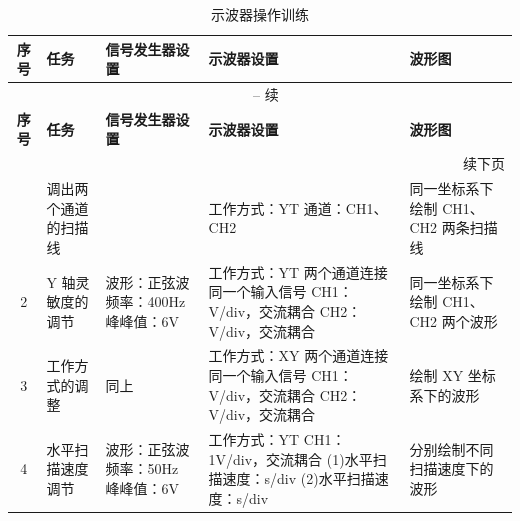 \documentclass[12pt,a4paper]{article}
\begin{document}
\begin{longtable}{|c|p{2cm}|p{2.5cm}|p{4.5cm}|p{4cm}|}
    \caption{示波器操作训练} \\
    \hline
    \textbf{序号} & \textbf{任务} & \textbf{信号发生器设置} & \textbf{示波器设置} & \textbf{波形图} \\
    \hline
    \endfirsthead
    
    \multicolumn{5}{c}{{\tablename\ \thetable{} -- 续}} \\
    \hline
    \textbf{序号} & \textbf{任务} & \textbf{信号发生器设置} & \textbf{示波器设置} & \textbf{波形图} \\
    \hline
    \endhead
    
    \hline
    \multicolumn{5}{r}{{续下页}} \\
    \endfoot
    
    \hline
    \endlastfoot
        1 & 调出两个通道的扫描线 & & 工作方式：YT \newline 通道：CH1、CH2 & 同一坐标系下绘制 CH1、CH2 两条扫描线 \\
        \hline
        2 & Y 轴灵敏度的调节 & 波形：正弦波 \newline 频率：400Hz \newline 峰峰值：6V & 工作方式：YT \newline 两个通道连接同一个输入信号 \newline CH1：\uline{\phantom{\hspace{2cm}}}V/div，交流耦合 \newline CH2：\uline{\phantom{\hspace{2cm}}}V/div，交流耦合 & 同一坐标系下绘制 CH1、CH2 两个波形  \\
        \hline
        3 & 工作方式的调整 & 同上 & 工作方式：XY \newline 两个通道连接同一个输入信号 \newline CH1：\uline{\phantom{\hspace{2cm}}}V/div，交流耦合 \newline CH2：\uline{\phantom{\hspace{2cm}}}V/div，交流耦合 & 绘制 XY 坐标系下的波形  \\
        \hline
        4 & 水平扫描速度调节 & 波形：正弦波 \newline 频率：50Hz \newline 峰峰值：6V & 工作方式：YT \newline CH1：1V/div，交流耦合 \newline (1)水平扫描速度：\uline{\phantom{\hspace{2cm}}}s/div \newline (2)水平扫描速度：\uline{\phantom{\hspace{2cm}}}s/div & 分别绘制不同扫描速度下的波形  \\

\end{longtable}
\end{document}
